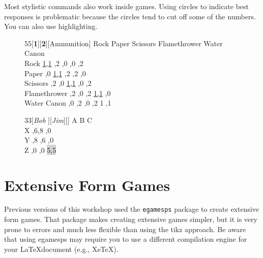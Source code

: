 \documentclass[10.5pt]{article}
\begin{document}
Most stylistic commands also work inside games. Using circles to indicate best responses is problematic because the circles tend to cut off some of the numbers. You can also use highlighting.

\begin{figure}[h!]
\begin{footnotesize}
 \begin{center}
\begin{game}{5}{5}[\textbf{1}][\textbf{2}][Ammunition]
       \> Rock    \> Paper   \> Scissors \> Flamethrower \> Water Canon  \\
Rock \> \underline{1,1}  ,2  ,0 ,0 ,2 \\
 Paper ,0    \> \underline{1,1}  ,2 ,2 ,0 \\
 Scissors ,2 ,0 \> \underline{1,1} ,0 ,2 \\
Flamethrower ,2  ,0 ,2 \> \underline{1,1} ,0 \\
 Water Canon ,0 ,2 ,0 ,2 \> \textcircled{1},\textcircled{1} \\
\end{game}
\end{center}
\end{footnotesize}
\end{figure}

\sgcolsep=0.5pt
\renewcommand{\gamestretch}{1.5}
\def\highlight#1{\colorbox{lightgray}{#1}}
\fboxsep=5pt
\begin{figure}[htb]\hspace*{\fill}%
\begin{center}
\begin{game}{3}{3}[{\em Bob}     ][{\em Jim}][]
        \> A \> B \> C   \\
X ,6,8 ,0   \\
Y ,8  ,6 ,0 \\
Z ,0 ,0 \>\highlight{5,5}\\
\end{game} 
\end{center} 
\end{figure}
 

\section{Extensive Form Games}
Previous versions of this workshop used the \verb+egamesps+ package to create extensive form games. That package makes creating extensive games simpler, but it is very prone to errors and much less flexible than using the tikz approach. Be aware that using egamesps may require you to use a different compilation engine for your \LaTeX document (e.g., XeTeX).
\end{document}
